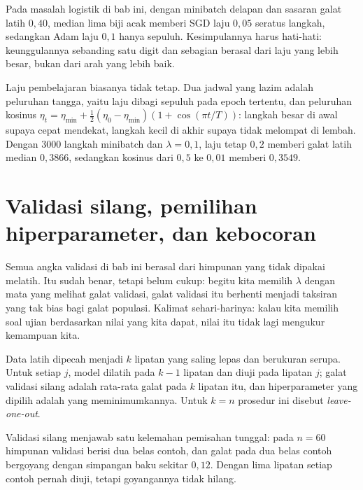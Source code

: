 Pada masalah logistik di bab ini, dengan minibatch delapan dan sasaran galat latih
$0{,}40$, median lima biji acak memberi SGD laju $0{,}05$ seratus langkah, sedangkan
Adam laju $0{,}1$ hanya sepuluh. Kesimpulannya harus hati-hati: keunggulannya sebanding
satu digit dan sebagian berasal dari laju yang lebih besar, bukan dari arah yang lebih
baik.

Laju pembelajaran biasanya tidak tetap. Dua jadwal yang lazim adalah peluruhan tangga,
yaitu laju dibagi sepuluh pada epoch tertentu, dan peluruhan kosinus
$\eta_t=\eta_{\min}+\frac12(\eta_0-\eta_{\min})(1+\cos(\pi t/T))$: langkah besar di awal
supaya cepat mendekat, langkah kecil di akhir supaya tidak melompat di lembah. Dengan
$3000$ langkah minibatch dan $\lambda=0{,}1$, laju tetap $0{,}2$ memberi galat latih
median $0{,}3866$, sedangkan kosinus dari $0{,}5$ ke $0{,}01$ memberi $0{,}3549$.

\section{Validasi silang, pemilihan hiperparameter, dan kebocoran}

Semua angka validasi di bab ini berasal dari himpunan yang tidak dipakai melatih. Itu
sudah benar, tetapi belum cukup: begitu kita memilih $\lambda$ dengan mata yang melihat
galat validasi, galat validasi itu berhenti menjadi taksiran yang tak bias bagi galat
populasi. Kalimat sehari-harinya: kalau kita memilih soal ujian berdasarkan nilai yang
kita dapat, nilai itu tidak lagi mengukur kemampuan kita.


\begin{definisi}
Data latih dipecah menjadi $k$ lipatan yang saling lepas dan berukuran serupa. Untuk
setiap $j$, model dilatih pada $k-1$ lipatan dan diuji pada lipatan $j$; galat validasi
silang adalah rata-rata galat pada $k$ lipatan itu, dan hiperparameter yang dipilih
adalah yang meminimumkannya. Untuk $k=n$ prosedur ini disebut
\emph{leave-one-out}.
\end{definisi}

Validasi silang menjawab satu kelemahan pemisahan tunggal: pada $n=60$ himpunan
validasi berisi dua belas contoh, dan galat pada dua belas contoh bergoyang dengan
simpangan baku sekitar $0{,}12$. Dengan lima lipatan setiap contoh pernah diuji, tetapi
goyangannya tidak hilang.

